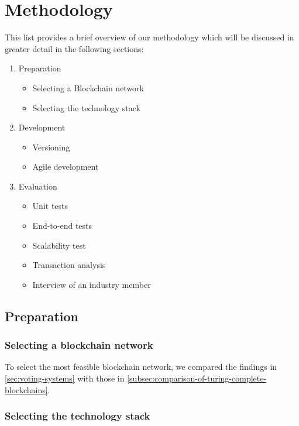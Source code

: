 \chapter{Methodology}\label{ch:methodology}

This list provides a brief overview of our methodology which will be discussed in greater detail in the following sections:

\begin{enumerate}
    \item Preparation
    \begin{itemize}
        \item Selecting a \gls{Blockchain} network
        \item Selecting the technology stack
    \end{itemize}
    \item Development
    \begin{itemize}
        \item Versioning
        \item Agile development
    \end{itemize}
    \item Evaluation
    \begin{itemize}
        \item Unit tests
        \item End-to-end tests
        \item Scalability test
        \item Transaction analysis
        \item Interview of an industry member
    \end{itemize}
\end{enumerate}

\section{Preparation}\label{sec:preparation}

\subsection{Selecting a blockchain network}\label{subsec:selection-of-blockchain-network2}

To select the most feasible blockchain network, we compared the findings in \cref{sec:voting-systems} with those in \cref{subsec:comparison-of-turing-complete-blockchains}.

\subsection{Selecting the technology stack}\label{subsec:selection-of-technology-stack}

